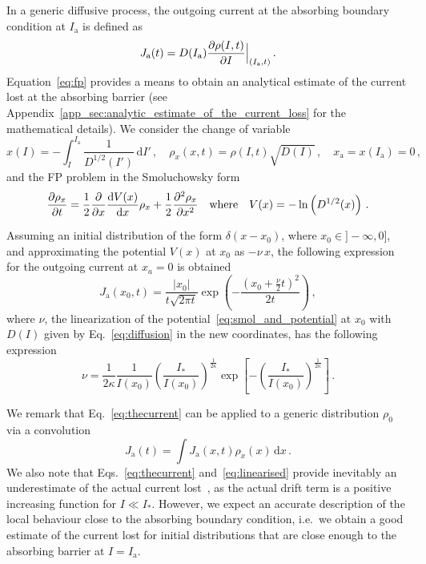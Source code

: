 In a generic diffusive process, the outgoing current at the absorbing boundary condition at $I_\mathrm{a}$ is defined as
\begin{equation}
    J_\mathrm{a}(t) = D(I_\mathrm{a})\pdv{\rho(I, t)}{I} \Bigr|_{(I_\mathrm{a}, t)}\,.
    \label{eq:outgoing_current_definition}
\end{equation}
Equation~\eqref{eq:fp} provides a means to obtain an analytical estimate of the current lost at the absorbing barrier (see Appendix~\ref{app_sec:analytic_estimate_of_the_current_loss} for the mathematical details). We consider the change of variable
\begin{equation}
    x(I) = -\int_I^{I_\mathrm{a}} \frac{1}{D^{1/2}(I')}\,\mathrm{d}I' \,, \quad \rho_x(x,t) = \rho(I, t) \sqrt{D(I)} \,, \quad x_\mathrm{a}=x(I_\mathrm{a})=0 \, ,
    \label{eq:change_of_variable}
\end{equation}
and the FP problem in the Smoluchowsky form
\begin{equation}
    \pdv{\rho_x}{t} = \frac{1}{2}\pdv{x} \dv{V(x)}{x} \rho_x+\frac{1}{2}\pdv[2]{\rho_x}{x} \quad \text{where} \quad V(x) = -\ln\left(D^{1/2}(x)\right) \, .
    \label{eq:smol_and_potential}
\end{equation}

{Assuming an initial distribution of the form $\delta(x - x_0)$, where $x_0 \in ] -\infty, 0]$, and approximating the potential $V(x)$ at $x_0$ as $-\nu \, x$, the following expression for the outgoing current at  $x_a = 0$ is obtained}
\begin{equation}
    J_\mathrm{a}(x_0, t) = \frac{|x_0|}{t\sqrt{2\pi t}}\exp\left(-\frac{(x_0+\frac{\nu}{2}t)^2}{2t}\right) \,,
    \label{eq:thecurrent}
\end{equation}
where $\nu$, the linearization of the potential~\eqref{eq:smol_and_potential} at $x_0$ with $D(I)$ given by Eq.~\eqref{eq:diffusion} in the new coordinates, has the following expression
\begin{equation}
    \nu=\frac{1}{2\kappa}\frac{1}{I(x_0)}\left(\frac{I_\ast}{I(x_0)}\right)^{\frac{1}{2\kappa}}\exp\left[-\left(\frac{I_\ast}{I(x_0)}\right)^{\frac{1}{2\kappa}}\right]\,.
    \label{eq:linearised}
\end{equation}

We remark that Eq.~\eqref{eq:thecurrent} can be applied to a generic distribution $\rho_0$ via a convolution
\begin{equation}
    J_\mathrm{a}(t) = \int J_\mathrm{a}(x,t)\rho_x(x)\,\mathrm{d}x\,.
    \label{eq:current_convolution}
\end{equation}
We also note that Eqs.~\eqref{eq:thecurrent} and~\eqref{eq:linearised} provide inevitably an underestimate of the actual current lost~\cite{montanari:ipac2021:tupab233}, as the actual drift term is a positive increasing function for $I\ll I_\ast$. However, we expect an accurate description of the local behaviour close to the absorbing boundary condition, i.e.\ we obtain a good estimate of the current lost for initial distributions that are close enough to the absorbing barrier at $I=I_\mathrm{a}$. 

